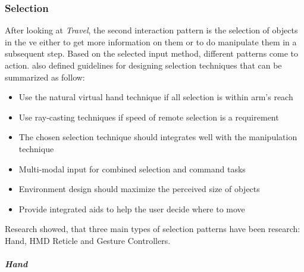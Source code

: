 
\subsubsection{Selection}

After looking at \textit{Travel}, the second interaction pattern is the selection of objects in the \gls{ve} either to get more information on them or to do manipulate them in a subsequent step. Based on the selected input method, different patterns come to action. \newline
\cite{Bowman2002} also defined guidelines for designing selection techniques that can be summarized as follow:
\begin{itemize}[noitemsep,nolistsep]
	\item Use the natural virtual hand technique if all selection is within arm's reach
	\item Use ray-casting techniques if speed of remote selection is a requirement
	\item The chosen selection technique should integrates well with the manipulation technique
	\item Multi-modal input for combined selection and command tasks
	\item Environment design should maximize the perceived size of objects
	\item Provide integrated aids to help the user decide where to move
\end{itemize}

Research showed, that three main types of selection patterns have been research: Hand, HMD Reticle and Gesture Controllers.

\subparagraph{Hand}

